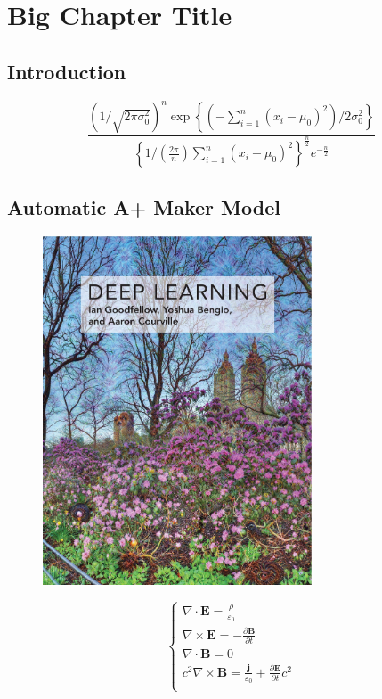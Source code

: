 \chapter{Big Chapter Title}







\section{Introduction}
\lipsum[1-2]
\begin{equation}
    \frac{\left( {{1}\Bigg/{\sqrt{2\pi \sigma _{0}^{2}}}} \right) ^n\exp \left\{ {{\left( -\sum_{i=1}^n{\left( x_i-\mu _0 \right) ^2} \right)}\Bigg/{2\sigma _{0}^{2}}} \right\}}{\left\{ {{1}\Bigg/{\left( \frac{2\pi}{n} \right) \sum_{i=1}^n{\left( x_i-\mu _0 \right) ^2}}} \right\} ^{\frac{n}{2}}e^{-\frac{n}{2}}}
\end{equation}


\section{Automatic A+ Maker Model}

\lipsum[1-2]
\begin{figure}
    \centering
    \includegraphics[width=8cm]{pic/DeepLearning.jpg}
\end{figure}
\lipsum[1-2]

\begin{equation}
    \left\{ \begin{array}{l}
        \nabla \cdot \boldsymbol{E}=\frac{\rho}{\varepsilon _0}\\
        \nabla \times \boldsymbol{E}=-\frac{\partial \boldsymbol{B}}{\partial t}\\
        \nabla \cdot \boldsymbol{B}=0\\
        c^2\nabla \times \boldsymbol{B}=\frac{\boldsymbol{j}}{\varepsilon _0}+\frac{\partial \boldsymbol{E}}{\partial t}c^2\\
    \end{array} \right. 
\end{equation}



